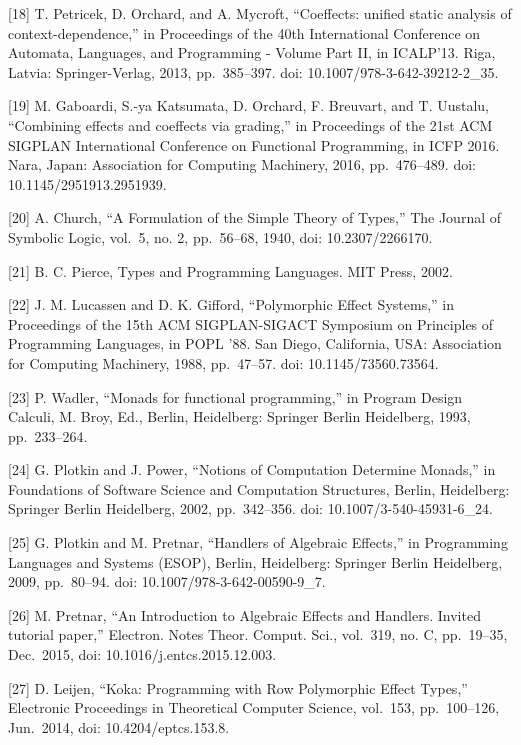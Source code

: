 {[}18{]} T. Petricek, D. Orchard, and A. Mycroft, ``Coeffects: unified static analysis
of context-dependence,'' in Proceedings of the 40th International Conference on
Automata, Languages, and Programming - Volume Part II, in ICALP'13. Riga, Latvia:
Springer-Verlag, 2013, pp.~385--397. doi: 10.1007/978-3-642-39212-2\_35.

{[}19{]} M. Gaboardi, S.-ya Katsumata, D. Orchard, F. Breuvart, and T. Uustalu,
``Combining effects and coeffects via grading,'' in Proceedings of the 21st ACM
SIGPLAN International Conference on Functional Programming, in ICFP 2016. Nara,
Japan: Association for Computing Machinery, 2016, pp.~476--489. doi:
10.1145/2951913.2951939.

{[}20{]} A. Church, ``A Formulation of the Simple Theory of Types,'' The Journal of
Symbolic Logic, vol.~5, no. 2, pp.~56--68, 1940, doi: 10.2307/2266170.

{[}21{]} B. C. Pierce, Types and Programming Languages. MIT Press, 2002.

{[}22{]} J. M. Lucassen and D. K. Gifford, ``Polymorphic Effect Systems,'' in
Proceedings of the 15th ACM SIGPLAN-SIGACT Symposium on Principles of Programming
Languages, in POPL '88. San Diego, California, USA: Association for Computing
Machinery, 1988, pp.~47--57. doi: 10.1145/73560.73564.

{[}23{]} P. Wadler, ``Monads for functional programming,'' in Program Design Calculi,
M. Broy, Ed., Berlin, Heidelberg: Springer Berlin Heidelberg, 1993, pp.~233--264.

{[}24{]} G. Plotkin and J. Power, ``Notions of Computation Determine Monads,'' in
Foundations of Software Science and Computation Structures, Berlin, Heidelberg:
Springer Berlin Heidelberg, 2002, pp.~342--356. doi: 10.1007/3-540-45931-6\_24.

{[}25{]} G. Plotkin and M. Pretnar, ``Handlers of Algebraic Effects,'' in Programming
Languages and Systems (ESOP), Berlin, Heidelberg: Springer Berlin Heidelberg, 2009,
pp.~80--94. doi: 10.1007/978-3-642-00590-9\_7.

{[}26{]} M. Pretnar, ``An Introduction to Algebraic Effects and Handlers. Invited
tutorial paper,'' Electron. Notes Theor. Comput. Sci., vol.~319, no. C, pp.~19--35,
Dec.~2015, doi: 10.1016/j.entcs.2015.12.003.

{[}27{]} D. Leijen, ``Koka: Programming with Row Polymorphic Effect Types,''
Electronic Proceedings in Theoretical Computer Science, vol.~153, pp.~100--126,
Jun.~2014, doi: 10.4204/eptcs.153.8.

